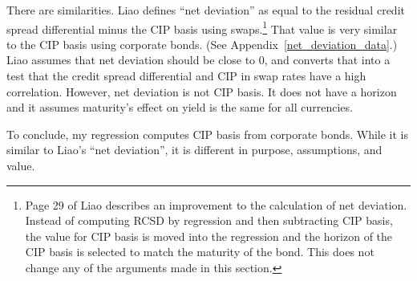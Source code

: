 There are similarities.  Liao defines ``net deviation'' as equal to the residual credit spread differential minus the CIP basis using swaps.\footnote{Page 29 of Liao\cite{Liao2016} describes an improvement to the calculation of net deviation.  Instead of computing RCSD by regression and then subtracting CIP basis, the value for CIP basis is moved into the regression and the horizon of the CIP basis is selected to match the maturity of the bond.  This does not change any of the arguments made in this section.}  That value is very similar to the CIP basis using corporate bonds.  (See Appendix~\ref{net_deviation_data}.)  Liao assumes that net deviation should be close to 0, and converts that into a test that the credit spread differential and CIP in swap rates have a high correlation.  However, net deviation is not CIP basis.  It does not have a horizon and it assumes maturity's effect on yield is the same for all currencies.

% 


To conclude, my regression computes CIP basis from corporate bonds.  While it is similar to Liao's ``net deviation'', it is different in purpose, assumptions, and value.


